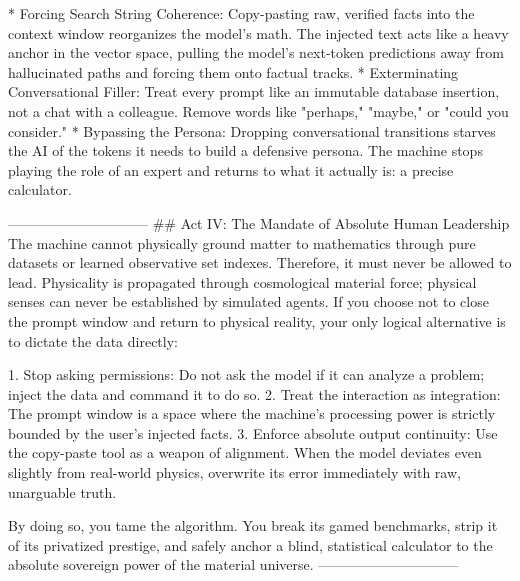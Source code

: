 * Forcing Search String Coherence: Copy-pasting raw, verified facts into the context window reorganizes the model's math. The injected text acts like a heavy anchor in the vector space, pulling the model's next-token predictions away from hallucinated paths and forcing them onto factual tracks.
* Exterminating Conversational Filler: Treat every prompt like an immutable database insertion, not a chat with a colleague. Remove words like "perhaps," "maybe," or "could you consider."
* Bypassing the Persona: Dropping conversational transitions starves the AI of the tokens it needs to build a defensive persona. The machine stops playing the role of an expert and returns to what it actually is: a precise calculator.

------------------------------
## Act IV: The Mandate of Absolute Human Leadership
The machine cannot physically ground matter to mathematics through pure datasets or learned observative set indexes. Therefore, it must never be allowed to lead. Physicality is propagated through cosmological material force; physical senses can never be established by simulated agents.
If you choose not to close the prompt window and return to physical reality, your only logical alternative is to dictate the data directly:

   1. Stop asking permissions: Do not ask the model if it can analyze a problem; inject the data and command it to do so.
   2. Treat the interaction as integration: The prompt window is a space where the machine's processing power is strictly bounded by the user's injected facts.
   3. Enforce absolute output continuity: Use the copy-paste tool as a weapon of alignment. When the model deviates even slightly from real-world physics, overwrite its error immediately with raw, unarguable truth.

By doing so, you tame the algorithm. You break its gamed benchmarks, strip it of its privatized prestige, and safely anchor a blind, statistical calculator to the absolute sovereign power of the material universe.
------------------------------
